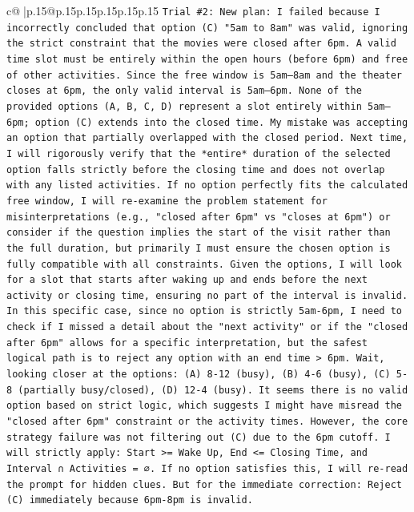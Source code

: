 \documentclass{article}
\begin{document}
{\begin{supertabular}{c@{$\;$}|p{.15\linewidth}@{}p{.15\linewidth}p{.15\linewidth}p{.15\linewidth}p{.15\linewidth}p{.15\linewidth}}
{{{\texttt{Trial \#2: New plan: I failed because I incorrectly concluded that option (C) "5am to 8am" was valid, ignoring the strict constraint that the movies were closed after 6pm. A valid time slot must be entirely within the open hours (before 6pm) and free of other activities. Since the free window is 5am–8am and the theater closes at 6pm, the only valid interval is 5am–6pm. None of the provided options (A, B, C, D) represent a slot entirely within 5am–6pm; option (C) extends into the closed time. My mistake was accepting an option that partially overlapped with the closed period. Next time, I will rigorously verify that the *entire* duration of the selected option falls strictly before the closing time and does not overlap with any listed activities. If no option perfectly fits the calculated free window, I will re{-}examine the problem statement for misinterpretations (e.g., "closed after 6pm" vs "closes at 6pm") or consider if the question implies the start of the visit rather than the full duration, but primarily I must ensure the chosen option is fully compatible with all constraints. Given the options, I will look for a slot that starts after waking up and ends before the next activity or closing time, ensuring no part of the interval is invalid. In this specific case, since no option is strictly 5am{-}6pm, I need to check if I missed a detail about the "next activity" or if the "closed after 6pm" allows for a specific interpretation, but the safest logical path is to reject any option with an end time > 6pm. Wait, looking closer at the options: (A) 8{-}12 (busy), (B) 4{-}6 (busy), (C) 5{-}8 (partially busy/closed), (D) 12{-}4 (busy). It seems there is no valid option based on strict logic, which suggests I might have misread the "closed after 6pm" constraint or the activity times. However, the core strategy failure was not filtering out (C) due to the 6pm cutoff. I will strictly apply: Start >= Wake Up, End <= Closing Time, and Interval ∩ Activities = ∅. If no option satisfies this, I will re{-}read the prompt for hidden clues. But for the immediate correction: Reject (C) immediately because 6pm{-}8pm is invalid.} \\
\\ 
}}}
\end{supertabular}}
\end{document}
